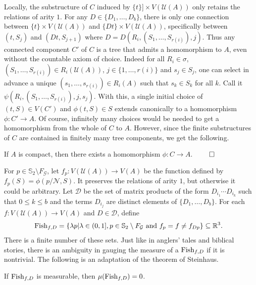 \documentclass{lmcs}
\def\fish{\mbox{\rm Fish}}
\begin{document}
\noindent Locally, the substructure of $C$ induced by $\{t\}] \times V(\mathcal{U}(A))$ only retains
the relations of arity $1$. For any $D \in \{D_1, \ldots, D_b\}$, there is only one connection 
between $\{t\} \times V(\mathcal{U}(A))$ and $\{D t\} \times V(\mathcal{U}(A))$,
specifically between $(t,S_j)$ and $(Dt,S_{j+1})$ where $D = D(R_i,(S_1, \ldots, S_{r(i)}),j)$.
Thus any connected component $C'$ of $C$ is a tree that admits a homomorphism to $A$,
even without the countable axiom of choice. 
Indeed for all $R_i \in \sigma$,
$(S_1, \ldots, S_{r(i)}) \in R_i(\mathcal{U}(A))$, $j \in \{1, \ldots, r(i)\}$
and $s_j \in S_j$, one can select in advance a unique 
$(s_1, \ldots, s_{r(i)}) \in R_i(A)$
such that $s_k \in S_k$ for all $k$. 
Call it $\psi(R_i,(S_1, \ldots, S_{r(i)}), j, s_j)$.
With this, a single initial choice of $(t,S) \in V(C')$
and $\phi(t,S) \in S$ extends canonically to
a homomorphism $\phi: C' \rightarrow A$. 
Of course, infinitely many choices would be needed to get a homomorphism from the whole of $C$ to $A$. However, since the finite substructures of $C$ are contained in finitely many 
tree components, we get the following. 
\begin{lem} \label{compacthom}
If $A$ is compact, then there exists a homomorphism $\phi: C \rightarrow A$.
\hfill $\qed$
\end{lem}
\noindent
For $p \in \mathbb{S}_2\setminus F_\mathcal{G}$, let $f_p: V(\mathcal{U}(A)) \rightarrow V(A)$
be the function defined by $f_p(S) = \phi(p/\mathcal{N},S)$. It preserves the relations of arity $1$,
but otherwise it could be arbitrary. Let $\mathcal{D}$ be the set of matrix products of the form 
$D_{i_1} \cdots D_{i_k}$ such that $0 \leq k \leq b$ and the terms $D_{i_j}$ are 
distinct elements of $\{D_1, \ldots, D_b\}$. For each $f: V(\mathcal{U}(A)) \rightarrow V(A)$
and $D \in \mathcal{D}$, define
$$\fish_{f,D} = \{\lambda p | \lambda \in (0,1], p \in \mathbb{S}_2\setminus F_\mathcal{G} \mbox{ and } 
f_{p} = f \neq f_{D p}\} \subseteq \mathbb{R}^3.$$
There is a finite number of these sets.
Just like in anglers' tales and biblical stories, there is an ambiguity in gauging the measure of a  $\fish_{f,D}$
if it is nontrivial. The following is an adaptation of the theorem of Steinhaus.
\begin{lem}\label{mezero}
If $\fish_{f,D}$ is measurable, then $\mu(\fish_{f,D}) = 0$.
\end{lem}
\end{document}
